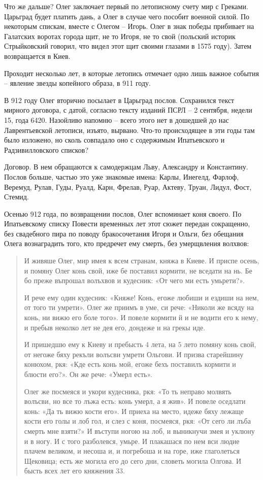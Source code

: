 Что же дальше? Олег заключает первый по летописному счету мир с Греками. Царьград будет платить дань, а Олег в случае чего пособит военной силой. По некоторым спискам, вместе с Олегом – Игорь. Олег в знак победы прибивает на Галатских воротах города щит, не то Игоря, не то свой (польский историк Стрыйковский говорил, что видел этот щит своими глазами в 1575 году). Затем возвращается в Киев.

Проходит несколько лет, в которые летопись отмечает одно лишь важное события – явление звезды копейного образа, в 911 году.

В 912 году Олег вторично посылает в Царьград послов. Сохранился текст мирного договора, с датой, согласно тексту изданий ПСРЛ – 2 сентября, недели 15, года 6420. Назойливо напомню – всего этого нет в дошедшей до нас Лаврентьевской летописи, изъято, вырвано. Что-то происходящее в эти годы там было изложено, но сколь совпадало оно с содержимым Ипатьевского и Радзивилловского списков?

Договор. В нем обращаются к самодержцам Льву, Александру и Константину. Послов больше, частью это уже знакомые имена: Карлы, Инегелд, Фарлоф, Веремуд, Рулав, Гуды, Руалд, Карн, Фрелав, Руар, Актеву, Труан, Лидул, Фост, Стемид.

Осенью 912 года, по возвращении послов, Олег вспоминает коня своего. По Ипатьевскому списку Повести временных лет этот сюжет передан сокращенно, без свадебного пира по поводу бракосочетания Игоря и Ольги, без обещания Олега вознаградить того, кто предречет ему смерть, без умерщвления волхвов:

\begin{quotation}
И живяше Олег, мир имея к всем странам, княжа в Киеве. И приспе осень, и помяну Олег конь свой, иже бе поставил кормити, не вседати на нь. Бе бо преже въпрошал волъхвов и кудесник: «От чего ми есть умьрети?». 

И рече ему один кудесник: «Княже! Конь, егоже любиши и ездиши на нем, от того ти умрети». Олег же приимъ в уме, си рече: «Николи же всяду на конь, ни вижю его боле того». И повеле кормити й и не водити его к нему, и пребыв неколко лет не дея его, дондеже и на грекы иде. 

И пришедшю ему к Киеву и пребысть 4 лета, на 5 лето помяну конь свой, от негоже бяху рекъли волъсви умрети Ольгови. И призва старейшину конюхом, ркя: «Кде есть конь мой, егоже бехъ поставилъ кормити и блюсти его?». Он же рече: «Умерл есть».

Олег же посмеяся и укори кудесника, ркя: «То ть неправо молвять волъсви, но все то лъжа есть: конь умерл, а я жив». И повеле оседлати конь: «Да ть вижю кости его». И приеха на место, идеже бяху лежаще кости его голы и лоб гол, и слез с коня, посмеяся, ркя: «От сего ли лъба смерть мне взяти?» И въступи ногою на лоб, и выникнучи змея и уклюну и в ногу. И с того разболевся, умьре. И плакашася по нем вси людие плачем великом, и несоша и, и погребоша и на горе, иже глаголеться Щековица; есть же могила его до сего дни, словеть могила Олгова. И бысть всех лет его княжения 33.
\end{quotation}

